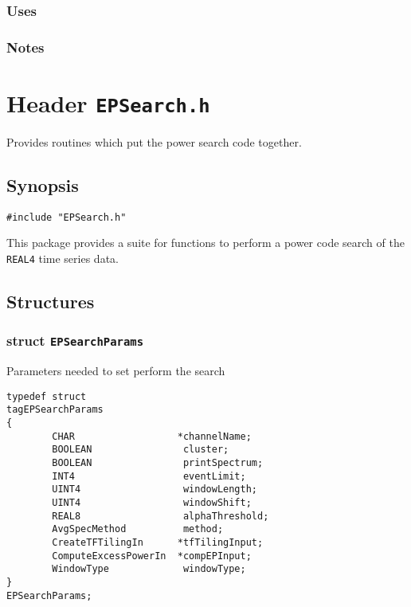 \subsubsection*{Uses}

\subsubsection*{Notes}

\vfill{\footnotesize}


%
%
%
%
%
%


\newpage
\section{Header \texttt{EPSearch.h}}
\label{s:EPSearch.h}

\noindent Provides routines which put the power search code together.

\subsection*{Synopsis}
\begin{verbatim}
#include "EPSearch.h"
\end{verbatim}

\noindent This package provides a suite for functions to perform a
power code search of the \texttt{REAL4} time series data.

\subsection*{Structures}

\subsubsection*{struct \texttt{EPSearchParams}}

\noindent Parameters needed to set perform the search

\begin{verbatim}
typedef struct
tagEPSearchParams
{
        CHAR                  *channelName;
        BOOLEAN                cluster;
        BOOLEAN                printSpectrum;
        INT4                   eventLimit;
        UINT4                  windowLength;
        UINT4                  windowShift;
        REAL8                  alphaThreshold;
        AvgSpecMethod          method;
        CreateTFTilingIn      *tfTilingInput;
        ComputeExcessPowerIn  *compEPInput;
        WindowType             windowType;
}
EPSearchParams;
\end{verbatim}

